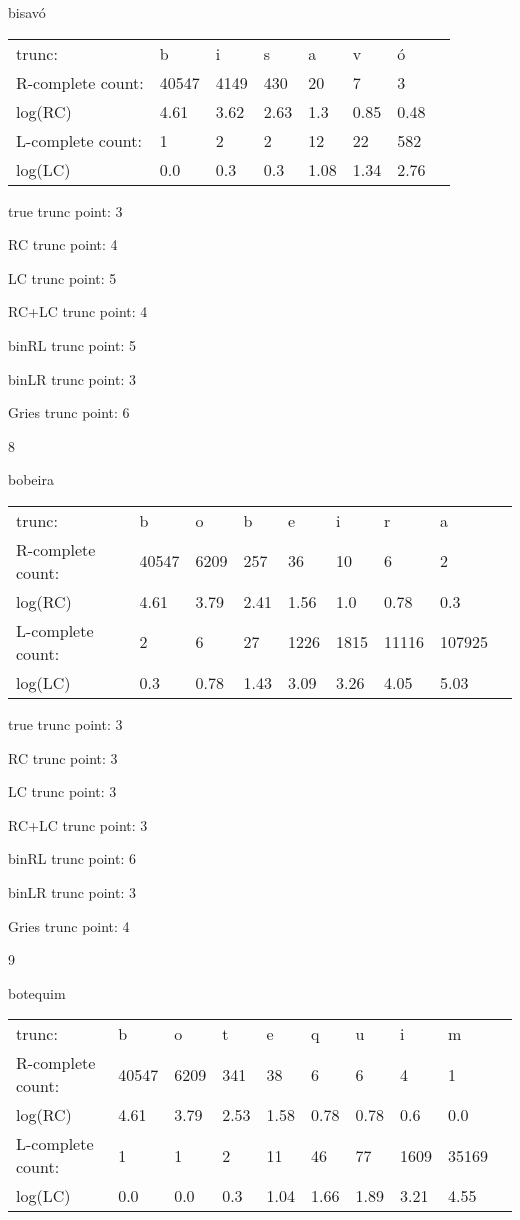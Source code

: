 \documentclass[10pt]{article}
\begin{document}
bisavó

\begin{tabular}{l|lllllll}
trunc: & b & i & s & a & v & ó & \\ 
R-complete count: & 40547 & 4149 & 430 & 20 & 7 & 3 & \\ 
log(RC) & 4.61 & 3.62 & 2.63 & 1.3 & 0.85 & 0.48 & \\ 
L-complete count: & 1 & 2 & 2 & 12 & 22 & 582 & \\ 
log(LC) & 0.0 & 0.3 & 0.3 & 1.08 & 1.34 & 2.76 & \\ 
\end{tabular}

true trunc point: 3

RC trunc point: 4

LC trunc point: 5

RC+LC trunc point: 4

binRL trunc point: 5

binLR trunc point: 3

Gries trunc point: 6

\vspace{1em}

8

bobeira

\begin{tabular}{l|llllllll}
trunc: & b & o & b & e & i & r & a & \\ 
R-complete count: & 40547 & 6209 & 257 & 36 & 10 & 6 & 2 & \\ 
log(RC) & 4.61 & 3.79 & 2.41 & 1.56 & 1.0 & 0.78 & 0.3 & \\ 
L-complete count: & 2 & 6 & 27 & 1226 & 1815 & 11116 & 107925 & \\ 
log(LC) & 0.3 & 0.78 & 1.43 & 3.09 & 3.26 & 4.05 & 5.03 & \\ 
\end{tabular}

true trunc point: 3

RC trunc point: 3

LC trunc point: 3

RC+LC trunc point: 3

binRL trunc point: 6

binLR trunc point: 3

Gries trunc point: 4

\newpage

9

botequim

\begin{tabular}{l|lllllllll}
trunc: & b & o & t & e & q & u & i & m & \\ 
R-complete count: & 40547 & 6209 & 341 & 38 & 6 & 6 & 4 & 1 & \\ 
log(RC) & 4.61 & 3.79 & 2.53 & 1.58 & 0.78 & 0.78 & 0.6 & 0.0 & \\ 
L-complete count: & 1 & 1 & 2 & 11 & 46 & 77 & 1609 & 35169 & \\ 
log(LC) & 0.0 & 0.0 & 0.3 & 1.04 & 1.66 & 1.89 & 3.21 & 4.55 & \\ 
\end{tabular}
\end{document}

